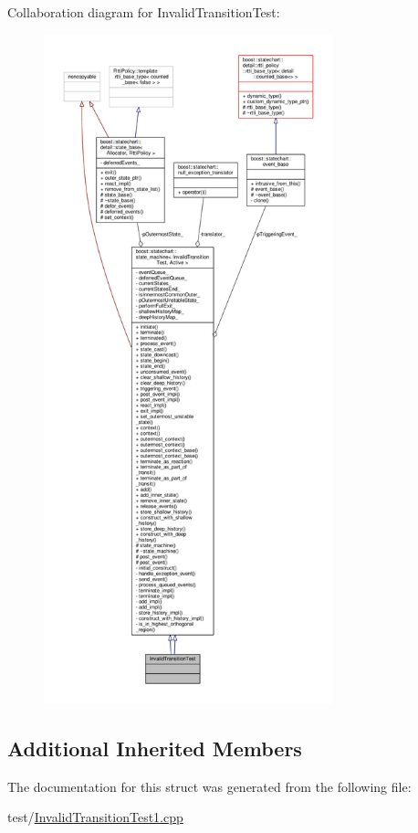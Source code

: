 Collaboration diagram for Invalid\+Transition\+Test\+:
\nopagebreak
\begin{figure}[H]
\begin{center}
\leavevmode
\includegraphics[height=550pt]{struct_invalid_transition_test__coll__graph}
\end{center}
\end{figure}
\subsection*{Additional Inherited Members}


The documentation for this struct was generated from the following file\+:\begin{DoxyCompactItemize}
\item 
test/\mbox{\hyperlink{_invalid_transition_test1_8cpp}{Invalid\+Transition\+Test1.\+cpp}}\end{DoxyCompactItemize}
